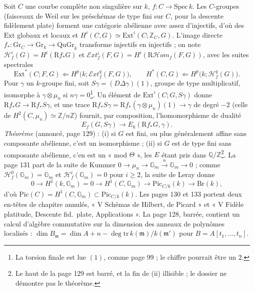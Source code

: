\documentclass[11pt,a4paper]{article}
\begin{document}
Soit $C$ une courbe complète non singulière sur $k$, $f : C \to \mathrm{Spec}\,k$.
Les $C$-groupes (faisceaux de Weil sur les préschémas de type fini sur $C$, pour la
descente fidèlement plate) forment une catégorie abélienne avec assez
d'injectifs, d'où des $\mathrm{Ext}$ globaux et locaux et $H^i(C, G) \simeq
\mathrm{Ext}^i(C; \mathbb{Z}_C, G)$. L'image directe $f_* : \mathrm{Gr}_C \to
\mathrm{Gr}_k \to \mathrm{QuGr}_k$ transforme injectifs en injectifs ; on note
$\mathcal{H}^i_f(G) = H^i(\mathrm{R}f_*G)$ et $\mathcal{E}xt^i_f(F, G) = H^i(\mathrm{R}
\mathcal{H}om_f(F, G))$, avec les suites spectrales
\[
\mathrm{Ext}^{*}(C; F, G) \Longleftarrow H^p\bigl(k; \mathcal{E}xt^q_f(F, G)\bigr),
\qquad
H^{*}(C, G) \Longleftarrow H^p\bigl(k; \mathcal{H}^q_f(G)\bigr).
\]
Pour $\gamma$ un $k$-groupe fini, soit $S\gamma = (D\Delta\gamma)(1)$, groupe de
type multiplicatif, isomorphe à $\gamma \otimes \mu_n$ si $n\gamma = 0$\footnote{La
torsion finale est lue $(1)$, comme page 99 ; le chiffre pourrait être un $2$.}.
Un élément de $\mathrm{Ext}^i(C; G, S\gamma)$ donne $\mathrm{R}f_*G \to
\mathrm{R}f_*S\gamma$, et une trace $\mathrm{R}f_*S\gamma =
\mathrm{R}f_*(\gamma \otimes \mu_n)(1) \to \gamma$ de degré $-2$ (celle de
$H^2(C, \mu_n) \simeq \mathbb{Z}/n\mathbb{Z}$) fournit, par composition,
l'homomorphisme de dualité
\[
E_f(G, S\gamma) \longrightarrow E_k(\mathrm{R}f_*G, \gamma).
\]
\emph{Théorème} (annoncé, page 129) : (i) si $G$ est fini, ou plus généralement
affine sans composante abélienne, c'est un isomorphisme ; (ii) si $G$ est de type
fini sans composante abélienne, c'en est un « mod $\Theta$ », les $E$ étant pris
dans $\mathbb{Q}/\mathbb{Z}$\footnote{Le haut de la page 129 est barré, et la fin
de (ii) illisible ; le dossier ne démontre pas le théorème.}. La page 131 part de
la suite de Kummer $0 \to \mu_n \to \mathbb{G}_m \xrightarrow{n} \mathbb{G}_m \to
0$ ; comme $\mathcal{H}^0_f(\mathbb{G}_m) = \mathbb{G}_m$ et
$\mathcal{H}^i_f(\mathbb{G}_m) = 0$ pour $i \geq 2$, la suite de Leray donne
\[
0 \to H^1(k, \mathbb{G}_m) = 0 \to H^1(C, \mathbb{G}_m) \to
\mathrm{Pic}_{C/k}(k) \to \mathrm{Br}(k),
\]
d'où $\mathrm{Pic}(C) = H^1(C, \mathbb{G}_m) \subset \mathrm{Pic}_{C/k}(k)$. Les
pages 130 et 133 portent deux en-têtes de chapitre annulés, « V Schémas de Hilbert,
de Picard » et « V Fidèle platitude, Descente fid.\ plate, Applications ». La page
128, barrée, contient un calcul d'algèbre commutative sur la dimension des anneaux
de polynômes localisés : $\dim B_{\mathfrak{m}} = \dim A + n - \deg\mathrm{tr}\,
k(\mathfrak{m})/k(\mathfrak{m}')$ pour $B = A[t_1, \ldots, t_n]$.
\end{document}
